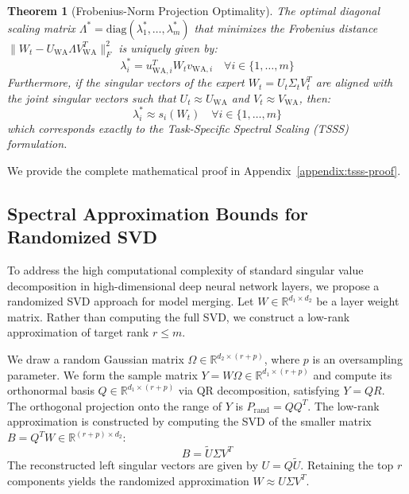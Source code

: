 \documentclass{article}
\theoremstyle{plain}
\newtheorem{theorem}{Theorem}[section]
\theoremstyle{definition}
\theoremstyle{remark}
\begin{document}
\begin{theorem}[Frobenius-Norm Projection Optimality]
\label{thm:tsss-optimality}
The optimal diagonal scaling matrix $\Lambda^* = \text{diag}(\lambda_1^*, \dots, \lambda_m^*)$ that minimizes the Frobenius distance $\| W_t - U_{\text{WA}} \Lambda V_{\text{WA}}^T \|_F^2$ is uniquely given by:
\begin{equation}
    \lambda_i^* = u_{\text{WA}, i}^T W_t v_{\text{WA}, i} \quad \forall i \in \{1, \dots, m\}
\end{equation}
Furthermore, if the singular vectors of the expert $W_t = U_t \Sigma_t V_t^T$ are aligned with the joint singular vectors such that $U_t \approx U_{\text{WA}}$ and $V_t \approx V_{\text{WA}}$, then:
\begin{equation}
    \lambda_i^* \approx s_i(W_t) \quad \forall i \in \{1, \dots, m\}
\end{equation}
which corresponds exactly to the Task-Specific Spectral Scaling (TSSS) formulation.
\end{theorem}

We provide the complete mathematical proof in Appendix~\ref{appendix:tsss-proof}.

\subsection{Spectral Approximation Bounds for Randomized SVD}
To address the high computational complexity of standard singular value decomposition in high-dimensional deep neural network layers, we propose a randomized SVD approach for model merging. Let $W \in \mathbb{R}^{d_1 \times d_2}$ be a layer weight matrix. Rather than computing the full SVD, we construct a low-rank approximation of target rank $r \le m$.

We draw a random Gaussian matrix $\Omega \in \mathbb{R}^{d_2 \times (r+p)}$, where $p$ is an oversampling parameter. We form the sample matrix $Y = W \Omega \in \mathbb{R}^{d_1 \times (r+p)}$ and compute its orthonormal basis $Q \in \mathbb{R}^{d_1 \times (r+p)}$ via QR decomposition, satisfying $Y = QR$. The orthogonal projection onto the range of $Y$ is $P_{\text{rand}} = Q Q^T$. The low-rank approximation is constructed by computing the SVD of the smaller matrix $B = Q^T W \in \mathbb{R}^{(r+p) \times d_2}$:
\begin{equation}
    B = \tilde{U} \Sigma V^T
\end{equation}
The reconstructed left singular vectors are given by $U = Q \tilde{U}$. Retaining the top $r$ components yields the randomized approximation $W \approx U \Sigma V^T$.
\end{document}
